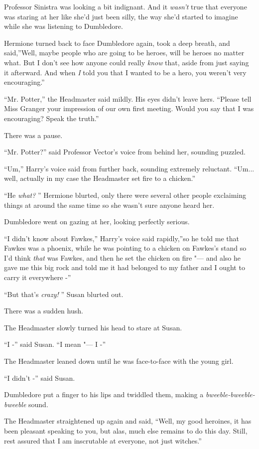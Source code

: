 Professor Sinistra was looking a bit indignant. And it \emph{wasn't}
true that everyone was staring at her like she'd just been silly, the
way she'd started to imagine while she was listening to Dumbledore.

Hermione turned back to face Dumbledore again, took a deep breath, and
said,''Well, maybe people who are going to be heroes, will be heroes no
matter what. But I don't see how anyone could really \emph{know} that,
aside from just saying it afterward. And when \emph{I} told you that I
wanted to be a hero, you weren't very encouraging.''

``Mr. Potter,'' the Headmaster said mildly. His eyes didn't leave hers.
``Please tell Miss Granger your impression of our own first meeting.
Would you say that I was encouraging? Speak the truth.''

There was a pause.

``Mr. Potter?'' said Professor Vector's voice from behind her, sounding
puzzled.

``Um,'' Harry's voice said from further back, sounding extremely
reluctant. ``Um... well, actually in my case the Headmaster set
fire to a chicken.''

``He \emph{what?} '' Hermione blurted, only there were several other
people exclaiming things at around the same time so she wasn't sure
anyone heard her.

Dumbledore went on gazing at her, looking perfectly serious.

``I didn't know about Fawkes,'' Harry's voice said rapidly,''so he told
me that Fawkes was a phoenix, while he was pointing to a chicken on
Fawkes's stand so I'd think \emph{that} was Fawkes, and then he set the
chicken on fire "--- and also he gave me this big rock and told me it had
belonged to my father and I ought to carry it everywhere -''

``But that's \emph{crazy!} '' Susan blurted out.

There was a sudden hush.

The Headmaster slowly turned his head to stare at Susan.

``I -'' said Susan. ``I mean "--- I -''

The Headmaster leaned down until he was face-to-face with the young
girl.

``I didn't -'' said Susan.

Dumbledore put a finger to his lips and twiddled them, making a
\emph{bweeble-bweeble-bweeble} sound.

The Headmaster straightened up again and said, ``Well, my good heroines,
it has been pleasant speaking to you, but alas, much else remains to do
this day. Still, rest assured that I am inscrutable at everyone, not
just witches.''

